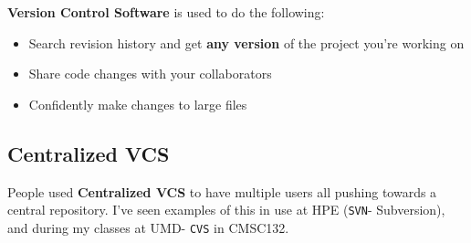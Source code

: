 \documentclass[english, 10pt]{article}
\begin{document}
\textbf{Version Control Software} is used to do the following:
\begin{itemize}
	\item Search revision history and get \textbf{any version} of the project you're working on
	\item Share code changes with your collaborators
	\item Confidently make changes to large files
\end{itemize}

\subsection{Centralized VCS}

People used \textbf{Centralized VCS} to have multiple users all pushing towards a central repository. I've seen examples of this in use at HPE (\texttt{SVN}- Subversion), and during my classes at UMD- \texttt{CVS} in CMSC132.
\end{document}
